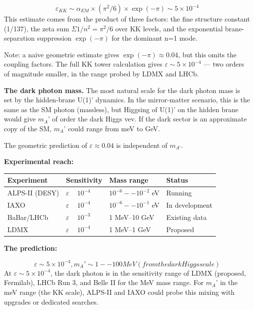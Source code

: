 \documentclass[aps,prd,preprint,superscriptaddress,longbibliography,floatfix]{revtex4-2}
\theoremstyle{remark}
\begin{document}
\begin{equation}
    \varepsilon_{KK} \sim  \alpha_{EM} \times (\pi^{2}/6) \times \exp(-\pi) \sim  5 \times 10^{-4}
\end{equation}
This estimate comes from the product of three factors: the fine structure constant (1/137), the zeta sum $\Sigma 1/n^{2} = \pi^{2}/6$ over KK levels, and the exponential brane-separation suppression $\exp(-\pi)$ for the dominant n=1 mode.

Note: a naive geometric estimate gives $\exp(-\pi) \approx 0.04$, but this omits the coupling factors. The full KK tower calculation gives $\varepsilon \sim  5 \times 10^{-4}$ --- two orders of magnitude smaller, in the range probed by LDMX and LHCb.

\textbf{The dark photon mass.} The most natural scale for the dark photon mass is set by the hidden-brane U(1)' dynamics. In the mirror-matter scenario, this is the same as the SM photon (massless), but Higgsing of U(1)' on the hidden brane would give $m_A$' of order the dark Higgs vev. If the dark sector is an approximate copy of the SM, $m_A$' could range from meV to GeV.

The geometric prediction of $\varepsilon \approx 0.04$ is independent of $m_{A'}$.

\textbf{Experimental reach:}


\begin{table}[H]
\begin{ruledtabular}
\begin{tabular}{p{3.8cm}p{3.8cm}p{3.8cm}p{3.8cm}}
Experiment & Sensitivity & Mass range & Status \\
\hline
ALPS-II (DESY) & $\varepsilon$ ~ $10^{-4}$ & $10^{-6}--10^{-2}$ eV & Running \\
IAXO & $\varepsilon$ ~ $10^{-4}$ & $10^{-6}--10^{-1}$ eV & In development \\
BaBar/LHCb & $\varepsilon$ ~ $10^{-3}$ & 1 MeV--10 GeV & Existing data \\
LDMX & $\varepsilon$ ~ $10^{-4}$ & 1 MeV--1 GeV & Proposed \\
\end{tabular}
\end{ruledtabular}
\end{table}

\textbf{The prediction:}


\begin{equation}
    \varepsilon \sim  5 \times 10^{-4},  m_A' \sim  1--100 MeV  (from the dark Higgs scale)
\end{equation}
At $\varepsilon \sim  5 \times 10^{-4}$, the dark photon is in the sensitivity range of LDMX (proposed, Fermilab), LHCb Run 3, and Belle II for the MeV mass range. For $m_A$' in the meV range (the KK scale), ALPS-II and IAXO could probe this mixing with upgrades or dedicated searches.
\end{document}
